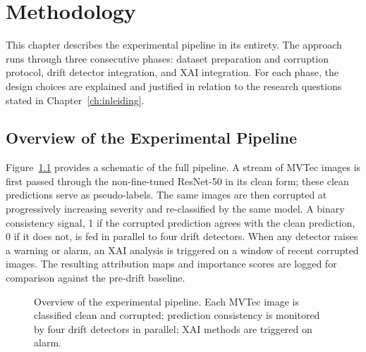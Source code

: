 
\chapter{Methodology}%
\label{ch:methodologie}

This chapter describes the experimental pipeline in its entirety. The approach runs through three consecutive phases: dataset preparation and corruption protocol, drift detector integration, and XAI integration. For each phase, the design choices are explained and justified in relation to the research questions stated in Chapter~\ref{ch:inleiding}.

\section{Overview of the Experimental Pipeline}
\label{sec:pipeline-overview}

Figure~\ref{fig:pipeline} provides a schematic of the full pipeline. A stream of MVTec images is first passed through the non-fine-tuned ResNet-50 in its clean form; these clean predictions serve as pseudo-labels. The same images are then corrupted at progressively increasing severity and re-classified by the same model. A binary consistency signal, 1 if the corrupted prediction agrees with the clean prediction, 0 if it does not, is fed in parallel to four drift detectors. When any detector raises a warning or alarm, an XAI analysis is triggered on a window of recent corrupted images. The resulting attribution maps and importance scores are logged for comparison against the pre-drift baseline.

\begin{figure}[h]
  \centering
  \caption[Experimental pipeline overview]{Overview of the experimental pipeline. Each MVTec image is classified clean and corrupted; prediction consistency is monitored by four drift detectors in parallel; XAI methods are triggered on alarm.}
  \label{fig:pipeline}
\end{figure}

